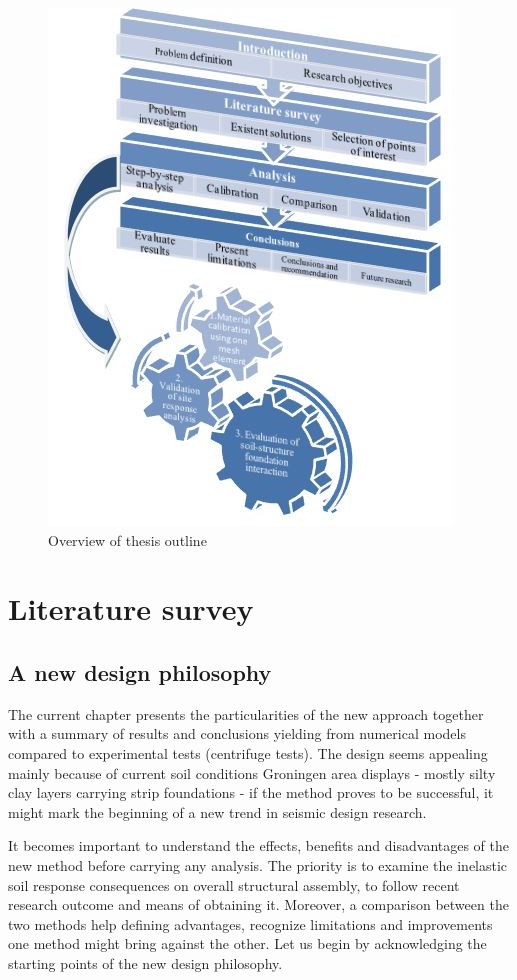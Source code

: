 \documentclass[12pt,a4paper]{report}
\begin{document}
\begin{figure}[h!]
	\centering
	\includegraphics[width=0.7\linewidth]{"outline"}
	\caption{Overview of thesis outline}
	\label{outline}
\end{figure}

\chapter{Literature survey}
\section{A new design philosophy}

The current chapter presents the particularities of the new approach together with a summary of results and conclusions yielding from numerical models compared to experimental tests (centrifuge tests). The design seems appealing mainly because of current soil conditions Groningen area displays - mostly silty clay layers carrying strip foundations - if the method proves to be successful, it might mark the beginning of a new trend in seismic design research.

It becomes important to understand the effects, benefits and disadvantages of the new method before carrying any analysis. The priority is to examine the inelastic soil response consequences on overall structural assembly, to follow recent research outcome and means of obtaining it. Moreover, a comparison between the two methods help defining advantages, recognize limitations and improvements one method might bring against the other. Let us begin by acknowledging the starting points of the new design philosophy.
\end{document}
